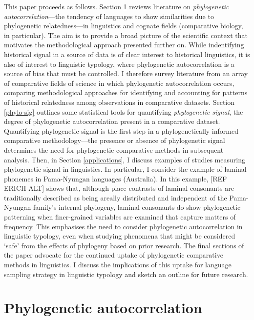 This paper proceeds as follows. Section \ref{phylo-autocorrelation} reviews literature on \emph{phylogenetic autocorrelation}---the tendency of languages to show similarities due to phylogenetic relatedness---in linguistics and cognate fields (comparative biology, in particular). The aim is to provide a broad picture of the scientific context that motivates the methodological approach presented further on. While indentifying historical signal in a source of data is of clear interest to historical linguistics, it is also of interest to linguistic typology, where phylogenetic autocorrelation is a source of bias that must be controlled. I therefore survey literature from an array of comparative fields of science in which phylogenetic autocorrelation occurs, comparing methodological approaches for identifying and accounting for patterns of historical relatedness among observations in comparative datasets. Section \ref{phylo-sig} outlines some statistical tools for quantifying \emph{phylogenetic signal}, the degree of phylogenetic autocorrelation present in a comparative dataset. Quantifying phylogenetic signal is the first step in a phylogenetically informed comparative methodology---the presence or absence of phylogenetic signal determines the need for phylogenetic comparative methods in subsequent analysis. Then, in Section \ref{applications}, I discuss examples of studies measuring phylogenetic signal in linguistics. In particular, I consider the example of laminal phonemes in Pama-Nyungan languages (Australia). In this example, {[}REF ERICH ALT{]} shows that, although place contrasts of laminal consonants are traditionally described as being areally distributed and independent of the Pama-Nyungan family's internal phylogeny, laminal consonants do show phylogenetic patterning when finer-grained variables are examined that capture matters of frequency. This emphasises the need to consider phylogenetic autocorrelation in linguistic typology, even when studying phenomena that might be considered `safe' from the effects of phylogeny based on prior research. The final sections of the paper advocate for the continued uptake of phylogenetic comparative methods in linguistics. I discuss the implications of this uptake for language sampling strategy in linguistic typology and sketch an outline for future research.

\hypertarget{phylo-autocorrelation}{%
\section{Phylogenetic autocorrelation}\label{phylo-autocorrelation}}

